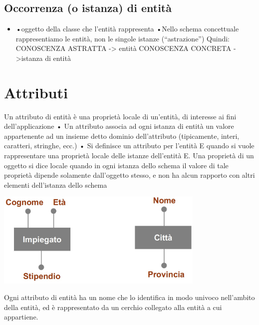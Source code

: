 \subsection{Occorrenza (o istanza) di entità}
\begin{itemize}
    \item 
•oggetto della classe che l'entità rappresenta
•Nello schema concettuale rappresentiamo le
entità, non le singole istanze (“astrazione”)
Quindi:
CONOSCENZA ASTRATTA -> entità
CONOSCENZA CONCRETA ->istanza di entità
\end{itemize}

\section{Attributi}
Un attributo di entità è una proprietà locale di un'entità,
di interesse ai fini dell'applicazione
• Un attributo associa ad ogni istanza di entità un valore
appartenente ad un insieme detto dominio dell'attributo
(tipicamente, interi, caratteri, stringhe, ecc.)
• Si definisce un attributo per l'entità E quando si vuole
rappresentare una proprietà locale delle istanze
dell'entità E.
Una proprietà di un oggetto si dice locale quando in
ogni istanza dello schema il valore di tale proprietà
dipende solamente dall'oggetto stesso, e non ha alcun
rapporto con altri elementi dell'istanza dello schema

\begin{center}
    \includegraphics[width=0.75\textwidth]{chaptersLezioniSara/img/Attributi1.jpg}
\end{center}
Ogni attributo di entità ha un nome che lo identifica in modo
univoco nell'ambito della entità, ed è rappresentato da un
cerchio collegato alla entità a cui appartiene.

